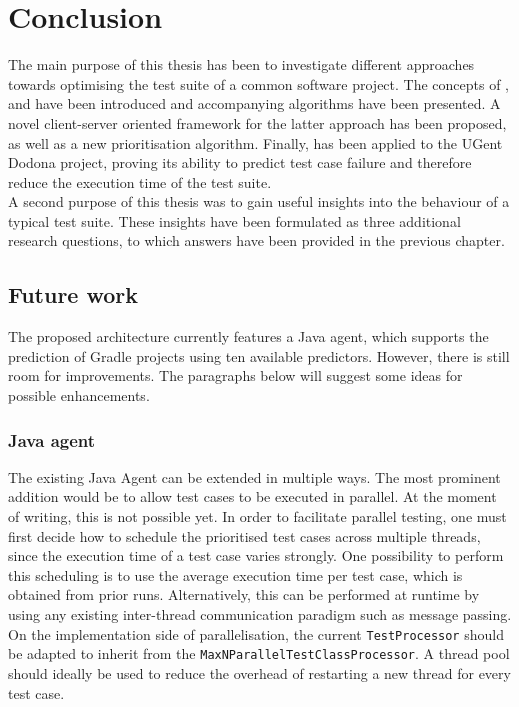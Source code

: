 
\chapter{Conclusion}
\label{ch:conclusion}

The main purpose of this thesis has been to investigate different approaches towards optimising the test suite of a common software project. The concepts of \tsm{}, \tcs{} and \tcp{} have been introduced and accompanying algorithms have been presented. A novel client-server oriented framework for the latter approach has been proposed, as well as a new prioritisation algorithm. Finally, \velocity{} has been applied to the UGent Dodona project, proving its ability to predict test case failure and therefore reduce the execution time of the test suite.\\

\noindent A second purpose of this thesis was to gain useful insights into the behaviour of a typical test suite. These insights have been formulated as three additional research questions, to which answers have been provided in the previous chapter.

\section{Future work}
The proposed architecture currently features a Java agent, which supports the prediction of Gradle projects using ten available predictors. However, there is still room for improvements. The paragraphs below will suggest some ideas for possible enhancements.

\subsection{Java agent}
The existing Java Agent can be extended in multiple ways. The most prominent addition would be to allow test cases to be executed in parallel. At the moment of writing, this is not possible yet. In order to facilitate parallel testing, one must first decide how to schedule the prioritised test cases across multiple threads, since the execution time of a test case varies strongly. One possibility to perform this scheduling is to use the average execution time per test case, which is obtained from prior runs. Alternatively, this can be performed at runtime by using any existing inter-thread communication paradigm such as message passing. On the implementation side of parallelisation, the current \texttt{TestProcessor} should be adapted to inherit from the \texttt{MaxNParallelTestClassProcessor}. A thread pool should ideally be used to reduce the overhead of restarting a new thread for every test case.

